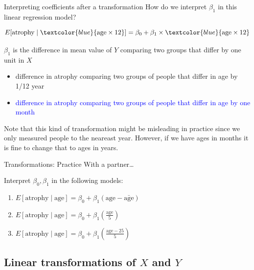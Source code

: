 \documentclass[10pt,t]{beamer}
\begin{document}
\begin{frame}{Interpreting coefficients after a transformation}
	How do we interpret $\beta_1$ in this linear regression model?
	
	$$
	E[\text{atrophy} \mid \textcolor{blue}{\text{age}\times12}] = \beta_0 + \beta_1 \times \textcolor{blue}{\text{age}\times12}
	$$
	
	\vspace{0.2cm}
	
	$\beta_1$ is the difference in mean value of $Y$ comparing two groups that differ by one unit in $X$
	
	\begin{itemize}
		\item[] difference in atrophy comparing two groups of people that differ in age by 1/12 year
		\item[] \textcolor{blue}{difference in atrophy comparing two groups of people that differ in age by one month}
	\end{itemize} 
	
	\vspace{0.3cm}
	
	Note that this kind of transformation might be misleading in practice since we only measured people to the neareast year. However, if we have ages in months it is fine to change that to ages in years.
	
\end{frame}

\begin{frame}{Transformations: Practice}
With a partner\dots

\vspace{0.3cm}

Interpret $\beta_0, \beta_1$ in the following models:
\medskip
	\begin{enumerate}
		\item $E[\text{atrophy} \mid \text{age}] = \beta_0 + \beta_1 (\text{age} - \bar{\text{age}})$
		\item $E[\text{atrophy} \mid \text{age}] = \beta_0 + \beta_1 \left( \frac{\text{age}}{5} \right)$
		\item $E[\text{atrophy} \mid \text{age}] = \beta_0 + \beta_1 \left( \frac{\text{age} - 25}{5} \right)$
	\end{enumerate}



\end{frame}

\subsection{Linear transformations of $X$ and $Y$}
\end{document}
